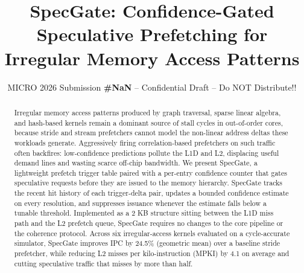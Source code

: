 \documentclass[sigconf, screen, review]{acmart}
\newcommand{\microsubmissionnumber}{NaN}
\begin{document}
\title{SpecGate: Confidence-Gated Speculative Prefetching for Irregular Memory Access
Patterns}
\subtitle{\normalsize{MICRO 2026 Submission \textbf{\#\microsubmissionnumber} --
  Confidential Draft -- Do NOT Distribute!!}}

\begin{abstract}
Irregular memory access patterns produced by graph traversal, sparse linear algebra, and
hash-based kernels remain a dominant source of stall cycles in out-of-order cores, because
stride and stream prefetchers cannot model the non-linear address deltas these workloads
generate. Aggressively firing correlation-based prefetchers on such traffic often backfires:
low-confidence predictions pollute the L1D and L2, displacing useful demand lines and
wasting scarce off-chip bandwidth. We present SpecGate, a lightweight prefetch trigger table
paired with a per-entry confidence counter that gates speculative requests before they are
issued to the memory hierarchy. SpecGate tracks the recent hit history of each trigger-delta
pair, updates a bounded confidence estimate on every resolution, and suppresses issuance
whenever the estimate falls below a tunable threshold. Implemented as a 2 KB structure
sitting between the L1D miss path and the L2 prefetch queue, SpecGate requires no changes to
the core pipeline or the coherence protocol. Across six irregular-access kernels evaluated
on a cycle-accurate simulator, SpecGate improves IPC by 24.5\% (geometric mean) over a
baseline stride prefetcher, while reducing L2 misses per kilo-instruction (MPKI) by 4.1 on
average and cutting speculative traffic that misses by more than half.
\end{abstract}



\maketitle

\noindent{}












\end{document}
